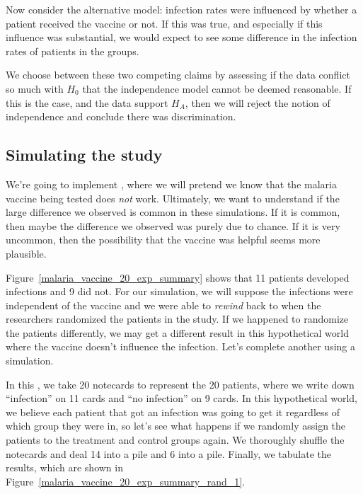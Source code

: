 Now consider the alternative model:
infection rates were influenced by whether a patient
received the vaccine or not.
If this was true, and especially if this influence
was substantial, we would expect to see some difference
in the infection rates of patients in the groups.

We choose between these two competing claims
by assessing if the data conflict so much with
$H_0$ that the independence model cannot be deemed
reasonable.
If this is the case, and the data support $H_A$,
then we will reject the notion of independence
and conclude there was discrimination.


\subsection{Simulating the study}
\label{simulatingTheStudy}

We're going to implement
,
where we will pretend we know that the malaria
vaccine being tested does \emph{not} work.
Ultimately, we want to understand if the large
difference we observed is common in these
simulations.
If it is common, then maybe the difference
we observed was purely due to chance.
If it is very uncommon, then the possibility
that the vaccine was helpful seems more plausible.

Figure~\ref{malaria_vaccine_20_exp_summary}
shows that 11 patients developed infections and 9 did not.
For our simulation, we will suppose the infections
were independent of the vaccine and we were able to
\emph{rewind} back to when the researchers randomized
the patients in the study.
If we happened to randomize the patients differently,
we may get a different result in this hypothetical
world where the vaccine doesn't influence the infection.
Let's complete another  using
a simulation.

In this , we take 20 notecards to
represent the 20 patients, where we write down ``infection''
on 11 cards and ``no infection'' on 9 cards.
In this hypothetical world, we believe each patient
that got an infection was going to get it regardless
of which group they were in, so let's see what happens
if we randomly assign the patients to the treatment
and control groups again.
We thoroughly shuffle the notecards and deal 14 into
a  pile and 6 into a  pile.
Finally, we tabulate the results, which are shown in
Figure~\ref{malaria_vaccine_20_exp_summary_rand_1}.

